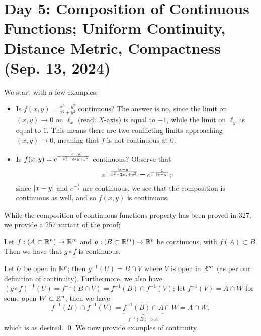 \section{Day 5: Composition of Continuous Functions; Uniform Continuity, Distance Metric, Compactness (Sep. 13, 2024)}
We start with a few examples:
\begin{itemize}
    \item Is $f(x, y) = \frac{x^2 - y^2}{x^2 + y^2}$ continuous? The answer is no, since the limit on $(x, y) \to 0$ on $\ell_x$ (read: $X$-axis) is equal to $-1$, while the limit on $\ell_y$ is equal to $1$. This means there are two conflicting limits approaching $(x, y) \to 0$, meaning that $f$ is not continuous at $0$.
    \item Is $f(x, y) = e^{-\frac{\left\lvert x - y \right\rvert}{x^2 - 2xy + y^2}}$ continuous? Observe that
    \[ e^{-\frac{\left\lvert x - y \right\rvert}{x^2 - 2xy + y^2}} = e^{-\frac{1}{\left\lvert x - y \right\rvert}}; \]
    since $\left\lvert x - y \right\rvert$ and $e^{-\frac{1}{x}}$ are continuous, we see that the composition is continuous as well, and so $f(x, y)$ is continuous.
\end{itemize}
While the composition of continuous functions property has been proved in 327, we provide a 257 variant of the proof;
\begin{simplethm}
    Let $f : (A \subset \mathbb R^n) \to \mathbb R^m$ and $g : (B \subset \mathbb R^m) \to \mathbb R^p$ be continuous, with $f(A) \subset B$. Then we have that $g \circ f$ is continuous.
\end{simplethm}
\noindent Let $U$ be open in $\mathbb R^p$; then $g^{-1}(U) = B \cap V$ where $V$ is open in $\mathbb R^m$ (as per our definition of continuity). Furthermore, we also have $(g \circ f)^{-1} (U) = f^{-1}(B \cap V) = f^{-1}(B) \cap f^{-1}(V)$; let $f^{-1}(V) = A \cap W$ for some open $W \subset \mathbb R^n$, then we have
\[ f^{-1}(B) \cap f^{-1}(V) = \underbrace{f^{-1}(B) \cap A}_{f^{-1}(B) \supset A} \cap W = A \cap W, \]
which is as desired. \qed
\medskip\newline
\noindent We now provide examples of continuity.
